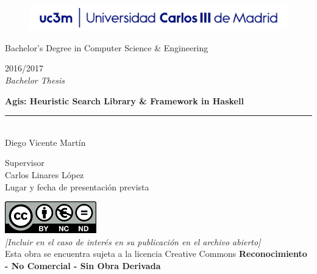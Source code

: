 \documentclass[a4paper,12pt]{article}
\begin{document}
\begin{titlepage}
  \begin{sffamily}
  \color{azulUC3M}
  \begin{center}
    \begin{figure}[htb]
      \begin{center}
        \vspace*{0.6cm}
        \includegraphics[width=15cm]{img/Portada_Logo.png}
        \vspace*{1.6cm}
      \end{center}
    \end{figure}
    
  \begin{Large}
    Bachelor's Degree in Computer Science \& Engineering\\
  \end{Large}
  
  \begin{LARGE}
    2016/2017 \\
    \vspace*{2cm}
    \textsl{Bachelor Thesis}\\
  \end{LARGE}
    
    \begin{huge}
      \textbf{Agis: Heuristic Search Library \& Framework in Haskell} \\
      \rule{80mm}{0.1mm}\\
      \vspace*{1cm}
      Diego Vicente Martín\\
    \end{huge}
    
    \vspace*{1cm}
    \begin{Large}
      Supervisor\\
      Carlos Linares López\\
      Lugar y fecha de presentación prevista\\
    \end{Large}
  \end{center}
  \vspace*{3cm}
  \color{black}
  \includegraphics{img/creativecommons.png}\\
  \emph{[Incluir en el caso de interés en su publicación en el archivo abierto]}\\
  Esta obra se encuentra sujeta a la licencia Creative Commons
  \textbf{Reconocimiento - No Comercial - Sin Obra Derivada}
  
\end{sffamily}
\end{titlepage}
\end{document}

